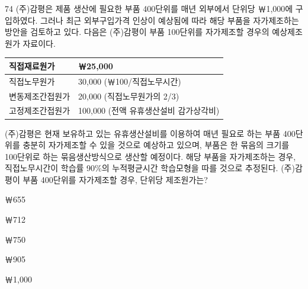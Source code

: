 \begin{question}{74}
(주)감평은 제품 생산에 필요한 부품 400단위를 매년 외부에서 단위당 ￦1,000에 구입하였다. 그러나 최근 외부구입가격 인상이 예상됨에 따라 해당 부품을 자가제조하는 방안을 검토하고 있다. 다음은 (주)감평이 부품 100단위를 자가제조할 경우의 예상제조원가 자료이다.
\par{\small\centering\begin{tabular}{|l|l|}\hline
직접재료원가 & ￦25,000 \\ \hline
직접노무원가 & \hspace{1em}30,000 (￦100/직접노무시간) \\ \hline
변동제조간접원가 & \hspace{1em}20,000 (직접노무원가의 2/3) \\ \hline
고정제조간접원가 & \hspace{1em}100,000 (전액 유휴생산설비 감가상각비) \\ \hline
\end{tabular}\par}
(주)감평은 현재 보유하고 있는 유휴생산설비를 이용하여 매년 필요로 하는 부품 400단위를 충분히 자가제조할 수 있을 것으로 예상하고 있으며, 부품은 한 묶음의 크기를 100단위로 하는 묶음생산방식으로 생산할 예정이다. 해당 부품을 자가제조하는 경우, 직접노무시간이 학습률 90\%의 누적평균시간 학습모형을 따를 것으로 추정된다. (주)감평이 부품 400단위를 자가제조할 경우, 단위당 제조원가는?
\begin{choices}
  \item ￦655
  \item ￦712
  \item ￦750
  \item ￦905
  \item ￦1,000
\end{choices}
\end{question}
